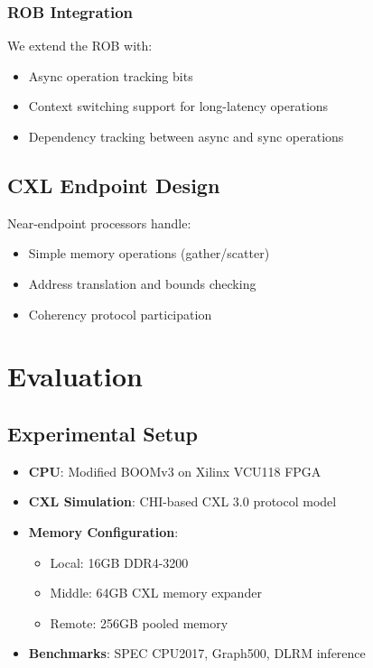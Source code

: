 \documentclass[10pt,conference]{IEEEtran}
\begin{document}
\subsubsection{ROB Integration}

We extend the ROB with:
\begin{itemize}
    \item Async operation tracking bits
    \item Context switching support for long-latency operations
    \item Dependency tracking between async and sync operations
\end{itemize}

\subsection{CXL Endpoint Design}

Near-endpoint processors handle:
\begin{itemize}
    \item Simple memory operations (gather/scatter)
    \item Address translation and bounds checking
    \item Coherency protocol participation
\end{itemize}

\section{Evaluation}

\subsection{Experimental Setup}

\begin{itemize}
    \item \textbf{CPU}: Modified BOOMv3 on Xilinx VCU118 FPGA
    \item \textbf{CXL Simulation}: CHI-based CXL 3.0 protocol model
    \item \textbf{Memory Configuration}: 
        \begin{itemize}
            \item Local: 16GB DDR4-3200
            \item Middle: 64GB CXL memory expander
            \item Remote: 256GB pooled memory
        \end{itemize}
    \item \textbf{Benchmarks}: SPEC CPU2017, Graph500, DLRM inference
\end{itemize}
\end{document}
